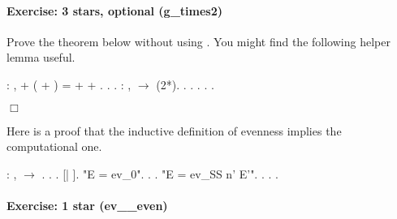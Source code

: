 \documentclass[12pt]{report}
\begin{document}
\paragraph{Exercise: 3 stars, optional (g\_times2)}

 Prove the  theorem below without using .
    You might find the following helper lemma useful. \begin{coqdoccode}
\coqdocemptyline
\coqdocnoindent
{}  : \coqdockw{\ensuremath{\forall}}   ,  + ( + ) =  +  + .\coqdoceol
\coqdocnoindent
{}.\coqdoceol
 .\coqdoceol
\coqdocemptyline
\coqdocnoindent
{} : \coqdockw{\ensuremath{\forall}} ,   \ensuremath{\rightarrow}  (2*).\coqdoceol
\coqdocnoindent
{}.\coqdoceol
\coqdocindent{1.50em}
  . .\coqdoceol
\coqdocindent{1.50em}
 .\coqdoceol
 .\coqdoceol
\end{coqdoccode}
\ensuremath{\Box} 

 Here is a proof that the inductive definition of evenness implies
the computational one. \begin{coqdoccode}
\coqdocemptyline
\coqdocnoindent
{}  : \coqdockw{\ensuremath{\forall}} ,\coqdoceol
\coqdocindent{1.00em}
  \ensuremath{\rightarrow}  .\coqdoceol
\coqdocnoindent
{}.\coqdoceol
\coqdocindent{1.00em}
  .    [|  ].\coqdoceol
\coqdocindent{1.00em}
 "E = ev\_0".\coqdoceol
\coqdocindent{2.00em}
 . .\coqdoceol
\coqdocindent{1.00em}
 "E = ev\_SS n' E'".\coqdoceol
\coqdocindent{2.00em}
 .  .\coqdoceol
\coqdocnoindent
{}.\coqdoceol
\coqdocemptyline
\end{coqdoccode}
\paragraph{Exercise: 1 star (ev\_\_even)}
\end{document}
